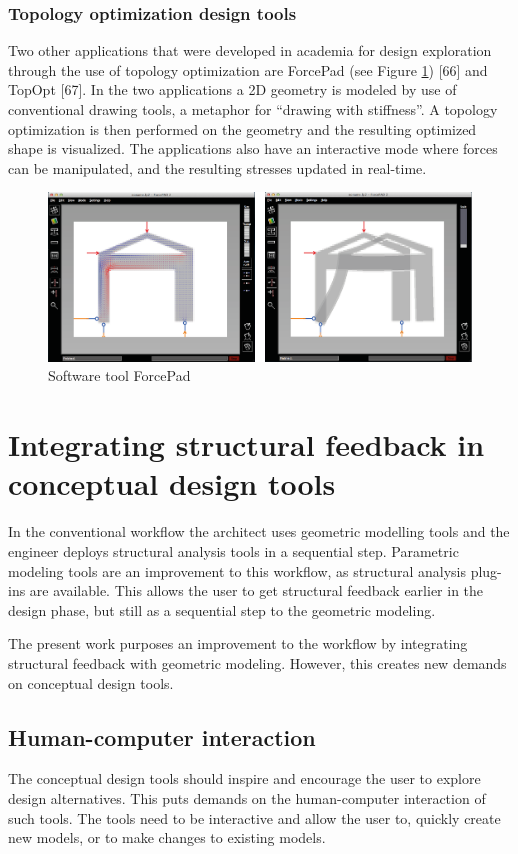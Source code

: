 \subsection{Topology optimization design tools}
Two other applications that were developed in academia for design exploration through the use of topology optimization are ForcePad (see Figure \ref{fig:forcepad}) [66] and TopOpt [67]. In the two applications a 2D geometry is modeled by use of conventional drawing tools, a metaphor for “drawing with stiffness”. A topology optimization is then performed on the geometry and the resulting optimized shape is visualized. The applications also have an interactive mode where forces can be manipulated, and the resulting stresses updated in real-time.

\begin{figure}
  \includegraphics[width=350pt]{graphics/forcepad.png}
  \caption{Software tool ForcePad}
  \label{fig:forcepad}
\end{figure}


\chapter{Integrating structural feedback in conceptual design tools}
\label{ch:Integrating structural feedback}
In the conventional workflow the architect uses geometric modelling tools and the engineer deploys structural analysis tools in a sequential step. Parametric modeling tools are an improvement to this workflow, as structural analysis plug-ins are available. This allows the user to get structural feedback earlier in the design phase, but still as a sequential step to the geometric modeling.

The present work purposes an improvement to the workflow by integrating structural feedback with geometric modeling. However, this creates new demands on conceptual design tools. 

\section{Human-computer interaction}
The conceptual design tools should inspire and encourage the user to explore design alternatives. This puts demands on the human-computer interaction of such tools. The tools need to be interactive and allow the user to, quickly create new models, or to make changes to existing models. 


